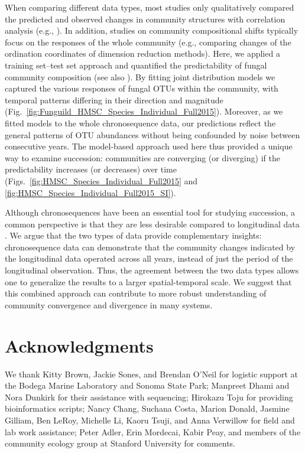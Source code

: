 When comparing different data types, most studies only qualitatively compared the predicted and observed changes in community structures with correlation analysis (e.g., \citealp{Foster2000, vanbreugel2006, Lebrijatrejos2010}). In addition, studies on community compositional shifts typically focus on the responses of the whole community (e.g., comparing changes of the ordination coordinates of dimension reduction methods).  
Here, we applied a training set--test set approach and quantified the predictability of fungal community composition (see also \citealp{Mora2015}). 
By fitting joint distribution models \citep{Ovaskainen2017} we captured the various responses of fungal OTUs within the community, with temporal patterns differing in their direction and magnitude (Fig.~\ref{fig:Funguild_HMSC_Species_Individual_Full2015}). 
Moreover, as we fitted models to the whole chronosequence data, our predictions reflect the general patterns of OTU abundances without being confounded by noise between consecutive years.
The model-based approach used here thus provided a unique way to examine succession: communities are converging (or diverging) if the predictability increases (or decreases) over time (Figs.~\ref{fig:HMSC_Species_Individual_Full2015} and \ref{fig:HMSC_Species_Individual_Full2015_SI}).
\par


Although chronosequences have been an essential tool for studying succession, a common perspective is that they are less desirable compared to longitudinal data \citep{Johnson2008}. 
We argue that the two types of data provide complementary insights: chronosequence data can demonstrate that the community changes indicated by the longitudinal data operated across all years, instead of just the period of the longitudinal observation. Thus, the agreement between the two data types allows one to generalize the results to a larger spatial-temporal scale.
We suggest that this combined approach can contribute to more robust understanding of community convergence and divergence in many systems.
\par



\section{Acknowledgments}
We thank Kitty Brown, Jackie Sones, and Brendan O'Neil for logistic support at the Bodega Marine Laboratory and Sonoma State Park; Manpreet Dhami and Nora Dunkirk for their assistance with sequencing; Hirokazu Toju for providing bioinformatics scripts; Nancy Chang, Suchana Costa, Marion Donald, Jasmine Gilliam, Ben LeRoy, Michelle Li, Kaoru Tsuji, and Anna Verwillow for field and lab work assistance; Peter Adler, Erin Mordecai, Kabir Peay, and members of the community ecology group at Stanford University for comments.



